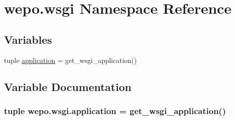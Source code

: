 \hypertarget{namespacewepo_1_1wsgi}{\section{wepo.\-wsgi Namespace Reference}
\label{namespacewepo_1_1wsgi}
}
\subsection*{Variables}
\begin{DoxyCompactItemize}
\item 
tuple \hyperlink{namespacewepo_1_1wsgi_aecec5f351e7bfcfba14194127f1ee8d3}{application} = get\-\_\-wsgi\-\_\-application()
\end{DoxyCompactItemize}


\subsection{Variable Documentation}
\hypertarget{namespacewepo_1_1wsgi_aecec5f351e7bfcfba14194127f1ee8d3}{
\subsubsection[{application}]{\setlength{\rightskip}{0pt plus 5cm}tuple wepo.\-wsgi.\-application = get\-\_\-wsgi\-\_\-application()}}\label{namespacewepo_1_1wsgi_aecec5f351e7bfcfba14194127f1ee8d3}

